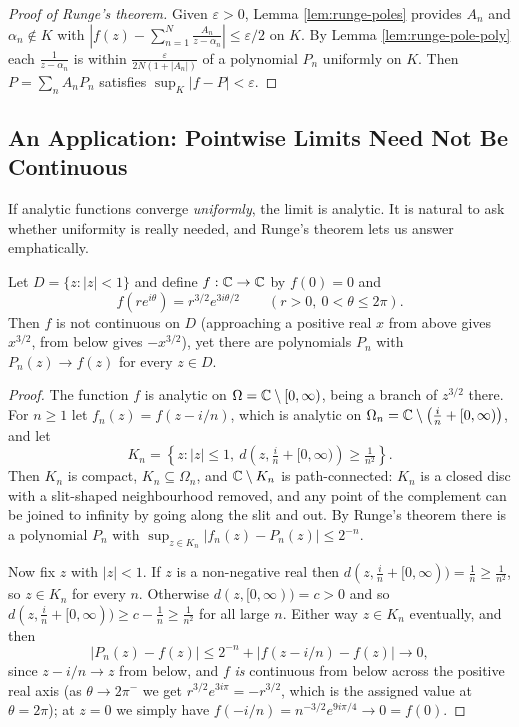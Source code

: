 \documentclass[a4paper]{scrartcl}
\begin{document}
\begin{proof}[Proof of Runge's theorem]
	Given $\varepsilon>0$, Lemma \ref{lem:runge-poles} provides $A_n$ and $\alpha_n\notin K$ with $\left|f(z)-\sum_{n=1}^N\frac{A_n}{z-\alpha_n}\right|\leq\varepsilon/2$ on $K$. By Lemma \ref{lem:runge-pole-poly} each $\frac{1}{z-\alpha_n}$ is within $\frac{\varepsilon}{2N(1+|A_n|)}$ of a polynomial $P_n$ uniformly on $K$. Then $P = \sum_n A_nP_n$ satisfies $\sup_K|f-P|<\varepsilon$.
\end{proof}

\subsection{An Application: Pointwise Limits Need Not Be Continuous}

If analytic functions converge \emph{uniformly}, the limit is analytic. It is natural to ask whether uniformity is really needed, and Runge's theorem lets us answer emphatically.

\begin{example}\label{ex:runge-pointwise}
	Let $D = \{z:|z|<1\}$ and define $f : \mathbb{C}\to\mathbb{C}$ by $f(0)=0$ and
	$$f(re^{i\theta}) = r^{3/2}e^{3i\theta/2}\qquad (r>0,\ 0<\theta\leq2\pi).$$
	Then $f$ is not continuous on $D$ (approaching a positive real $x$ from above gives $x^{3/2}$, from below gives $-x^{3/2}$), yet there are polynomials $P_n$ with $P_n(z)\to f(z)$ for every $z\in D$.
\end{example}

\begin{proof}
	The function $f$ is analytic on $\Omega = \mathbb{C}\setminus[0,\infty)$, being a branch of $z^{3/2}$ there. For $n\geq1$ let $f_n(z) = f(z-i/n)$, which is analytic on $\Omega_n = \mathbb{C}\setminus\left(\tfrac in + [0,\infty)\right)$, and let
	$$K_n = \left\{z : |z|\leq 1,\ d\left(z,\tfrac in+[0,\infty)\right)\geq \tfrac{1}{n^2}\right\}.$$
	Then $K_n$ is compact, $K_n\subseteq\Omega_n$, and $\mathbb{C}\setminus K_n$ is path-connected: $K_n$ is a closed disc with a slit-shaped neighbourhood removed, and any point of the complement can be joined to infinity by going along the slit and out. By Runge's theorem there is a polynomial $P_n$ with $\sup_{z\in K_n}|f_n(z)-P_n(z)|\leq2^{-n}$.

	Now fix $z$ with $|z|<1$. If $z$ is a non-negative real then $d(z,\tfrac in+[0,\infty)) = \tfrac1n\geq\tfrac1{n^2}$, so $z\in K_n$ for every $n$. Otherwise $d(z,[0,\infty)) = c > 0$ and so $d(z,\tfrac in +[0,\infty))\geq c - \tfrac1n \geq \tfrac{1}{n^2}$ for all large $n$. Either way $z\in K_n$ eventually, and then
	$$|P_n(z)-f(z)| \leq 2^{-n} + |f(z - i/n)-f(z)| \to 0,$$
	since $z-i/n\to z$ from below, and $f$ \emph{is} continuous from below across the positive real axis (as $\theta\to2\pi^-$ we get $r^{3/2}e^{3i\pi} = -r^{3/2}$, which is the assigned value at $\theta = 2\pi$); at $z=0$ we simply have $f(-i/n) = n^{-3/2}e^{9i\pi/4}\to0=f(0)$.
\end{proof}
\end{document}
